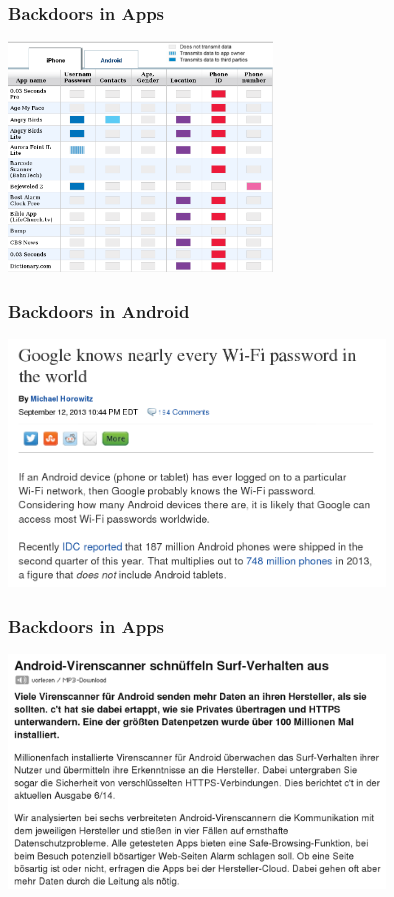 \documentclass[12pt]{beamer}
\begin{document}
\begin{frame}
  \frametitle{Backdoors in Apps}
  \begin{center}
    \includegraphics[width=7cm]{img/backdoor-apps}
  \par\end{center}
\end{frame}

\begin{frame}
  \frametitle{Backdoors in Android}
  \begin{center}
    \includegraphics[width=10cm]{img/backdoor-android}
  \par\end{center}
\end{frame}

\begin{frame}
  \frametitle{Backdoors in Apps}
  \begin{center}
    \includegraphics[width=10cm]{img/backdoor-av}
  \par\end{center}
\end{frame}
\end{document}

